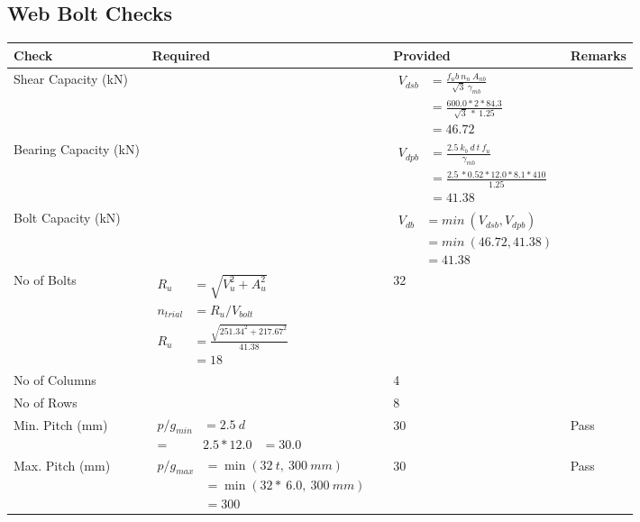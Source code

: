 \documentclass{article}%
\begin{document}
\subsection{Web Bolt Checks}%
\label{subsec:WebBoltChecks}%
\renewcommand{\arraystretch}{1.2}%
\begin{longtable}{|p{4cm}|p{6cm}|p{5.5cm}|p{1.5cm}|}%
\hline%
\rowcolor{OsdagGreen}%
Check&Required&Provided&Remarks\\%
\hline%
\endhead%
\hline%
Shear Capacity (kN)&&$\begin{aligned}V_{dsb} &= \frac{f_ub ~n_n~ A_{nb}}{\sqrt{3} ~\gamma_{mb}}\\ &= \frac{600.0*2*84.3}{\sqrt{3}~*~1.25}\\ &= 46.72\end{aligned}$&\\%
\hline%
Bearing Capacity (kN)&&$\begin{aligned}V_{dpb} &= \frac{2.5~ k_b~ d~ t~ f_u}{\gamma_{mb}}\\ &= \frac{2.5~*0.52*12.0*8.1*410}{1.25}\\ &=41.38\end{aligned}$&\\%
\hline%
Bolt Capacity (kN)&&$\begin{aligned}V_{db} &= min~ (V_{dsb}, V_{dpb})\\ &= min~ (46.72,41.38)\\ &=41.38\end{aligned}$&\\%
\hline%
No of Bolts&$\begin{aligned}R_{u} &= \sqrt{V_u^2+A_u^2}\\ n_{trial} &= R_u/ V_{bolt}\\ R_{u} &= \frac{\sqrt{251.34^2+217.67^2}}{41.38}\\ &=18\end{aligned}$&32&\\%
\hline%
No of Columns&&4&\\%
\hline%
No of Rows&&8&\\%
\hline%
Min. Pitch (mm)&$\begin{aligned}p/g_{min}&= 2.5 ~ d&\\ =&2.5*12.0&=30.0\end{aligned}$&30&Pass\\%
\hline%
Max. Pitch (mm)&$\begin{aligned}p/g_{max} &=\min(32~t,~300~mm)&\\ &=\min(32 *~6.0,~ 300 ~mm)\\&=300\end{aligned}$&30&Pass\\%

\end{longtable}
\end{document}
